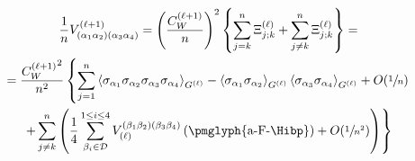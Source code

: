\documentclass{beamer}
\def\mi#1{{\alpha_{#1}}}
\def\mj#1{\beta_{#1}}
\def\eell{{(\ell)}}
\def\eellum{{(\ell+1)}}
\newcommand{\Vertice}[5]{V^{(#1)}_{(\mi#2\mi#3)(\mi#4\mi#5)}}
\newcommand{\Verticeinvb}[5]{V_{(#1)}^{(\mj#2\mj#3)(\mj#4\mj#5)}}
\newcommand{\Expectation}[2]{\left\langle #1 \right\rangle_{#2}}
\begin{document}
\begin{frame}
	\small
	\begin{multline*}
		\frac{1}{n}\Vertice{\ell+1}1234 =  \left(\frac{C_W^\eellum}{n}\right)^2 \left\{\sum_{j=k}^{n}\Xi_{j;k}^\eell + \sum_{j\neq k}^{n}\Xi_{j;k}^\eell\right\} = \\
		= \frac{{C_W^\eellum}^2}{n^2} \left\{\sum_{j=1}^{n}\Expectation{\sigma_\mi1\sigma_\mi2\sigma_\mi3\sigma_\mi4}{G^\eell} - \Expectation{\sigma_\mi1\sigma_\mi2}{G^\eell}  \Expectation{\sigma_\mi3\sigma_\mi4}{G^\eell}  +  O(\sfrac{1}{n}) \right.\\ 
		\left. +\sum_{j\neq k}^{n}\left(\frac{1}{4}\sum_{\mj{i}\in\mathcal{D}}^{1\le{i}\le4}\Verticeinvb{\ell}1234\left(\text{\pmglyph{a-F-\Hibp}}\right) + O(\sfrac{1}{n^2})\right)\right\} 
	\end{multline*}
\end{frame}
\end{document}
